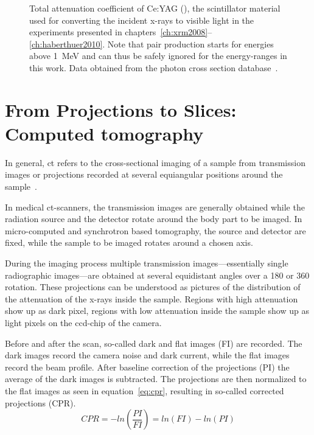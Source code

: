 \def\width{\linewidth}%
\def\height{0.618\linewidth}%
\begin{figure}[h]
		\centering
	\caption[Total attenuation coefficient of Ce:YAG]{Total attenuation coefficient of Ce:YAG (), the scintillator material used for converting the incident x-rays to visible light in the experiments presented in chapters~\ref{ch:xrm2008}--\ref{ch:haberthuer2010}. Note that pair production starts for energies above \SI{1}{\mega\electronvolt} and can thus be safely ignored for the energy-ranges in this work. Data obtained from the photon cross section database~\cite{XCOM}.}
	\label{fig:yag attenuation}
\end{figure}

\section{From Projections to Slices: Computed tomography}
In general, \ac{ct} refers to the cross-sectional imaging of a sample from transmission images or projections recorded at several equiangular positions around the sample~\cite{Kak2002}.

In medical \ac{ct}-scanners, the transmission images are generally obtained while the radiation source and the detector rotate around the body part to be imaged. In micro-computed and synchrotron based tomography, the source and detector are fixed, while the sample to be imaged rotates around a chosen axis.

During the imaging process multiple transmission images---essentially single radiographic images---are obtained at several equidistant angles over a \unit{180}{\degree} or \unit{360}{\degree} rotation. These projections can be understood as pictures of the distribution of the attenuation of the x-rays inside the sample. Regions with high attenuation show up as dark pixel, regions with low attenuation inside the sample show up as light pixels on the \ac{ccd}-chip of the camera.

Before and after the scan, so-called dark and flat images (FI) are recorded. The dark images record the camera noise and dark current, while the flat images record the beam profile. After baseline correction of the projections (PI) the average of the dark images is subtracted. The projections are then normalized to the flat images as seen in equation~\ref{eq:cpr}, resulting in so-called corrected projections (CPR).%
\begin{equation}%
	CPR=-ln\left(\frac{PI}{FI}\right)=ln(FI)-ln(PI)%
	\label{eq:cpr}%
\end{equation}%

